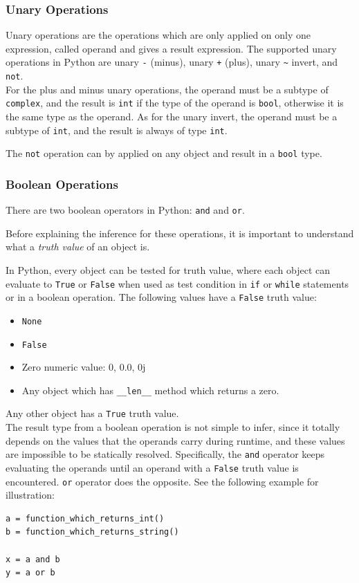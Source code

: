 \subsubsection{Unary Operations}
Unary operations are the operations which are only applied on only one expression, called operand and gives a result expression. The supported unary operations in Python are unary \lstinline|-| (minus), unary \lstinline|+| (plus), unary \lstinline|~| invert, and \lstinline|not|.\\

For the plus and minus unary operations, the operand must be a subtype of \lstinline|complex|, and the result is \lstinline|int| if the type of the operand is \lstinline|bool|, otherwise it is the same type as the operand. As for the unary invert, the operand must be a subtype of \lstinline|int|, and the result is always of type \lstinline|int|.

The \lstinline|not| operation can by applied on any object and result in a \lstinline|bool| type.


\subsubsection{Boolean Operations}
There are two boolean operators in Python: \lstinline|and| and \lstinline|or|.

Before explaining the inference for these operations, it is important to understand what a \textit{truth value} of an object is.

In Python, every object can be tested for truth value, where each object can evaluate to \lstinline|True| or \lstinline|False| when used as test condition in \lstinline|if| or \lstinline|while| statements or in a boolean operation. The following values have a \lstinline|False| truth value:
\begin{itemize}
	\item \lstinline|None|
	\item \lstinline|False|
	\item Zero numeric value: 0, 0.0, 0j
	\item Any object which has \lstinline|__len__| method which returns a zero.
\end{itemize}
Any other object has a \lstinline|True| truth value. \\

The result type from a boolean operation is not simple to infer, since it totally depends on the values that the operands carry during runtime, and these values are impossible to be statically resolved. Specifically, the \lstinline|and| operator keeps evaluating the operands until an operand with a \lstinline|False| truth value is encountered. \lstinline|or| operator does the opposite. See the following example for illustration:
\begin{lstlisting}
a = function_which_returns_int()
b = function_which_returns_string()

x = a and b
y = a or b
\end{lstlisting}

